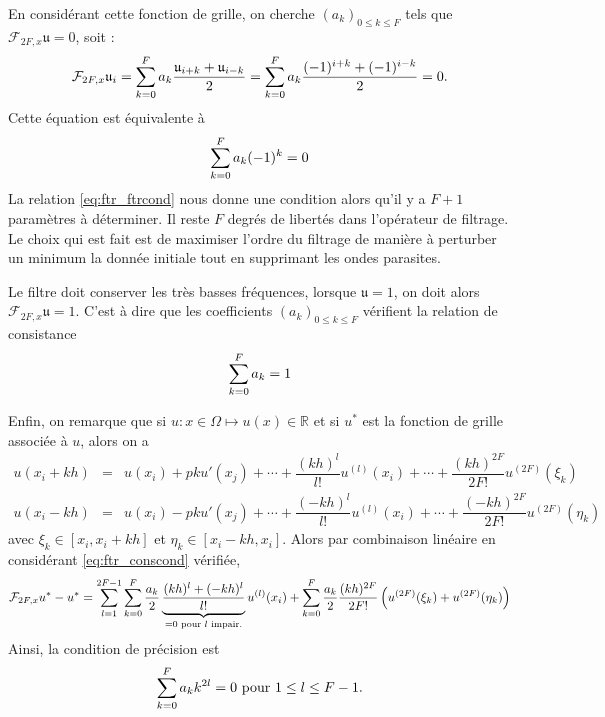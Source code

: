 En considérant cette fonction de grille, on cherche $(a_k)_{0\leq k \leq F}$ tels que $\mathcal{F}_{2F,x} \mathfrak{u} = \mathfrak{0}$, soit :
\begin{equation}
\mathcal{F}_{2F,x}\mathfrak{u}_i = \displaystyle\sum\limits_{k=0}^F a_k \dfrac{\mathfrak{u}_{i+k} + \mathfrak{u}_{i-k}}{2} = \displaystyle\sum\limits_{k=0}^F a_k  \dfrac{(-1)^{i+k} + (-1)^{i-k}}{2} = 0.
\end{equation}
Cette équation est équivalente à 
\begin{equation}
\displaystyle\sum\limits_{k=0}^F a_k (-1)^k = 0
\label{eq:ftr_ftrcond}
\end{equation}
La relation \eqref{eq:ftr_ftrcond} nous donne une condition alors qu'il y a $F+1$ paramètres à déterminer. Il reste $F$ degrés de libertés dans l'opérateur de filtrage. Le choix qui est fait est de maximiser l'ordre du filtrage de manière à perturber un minimum la donnée initiale tout en supprimant les ondes parasites.

Le filtre doit conserver les très basses fréquences, lorsque $\mathfrak{u} = \mathfrak{1}$, on doit alors $\mathcal{F}_{2F,x}\mathfrak{u} = \mathfrak{1}$.
C'est à dire que les coefficients $(a_k)_{0 \leq k \leq F}$ vérifient la relation de consistance
\begin{equation}
\displaystyle\sum\limits_{k=0}^F a_k = 1
\label{eq:ftr_conscond}
\end{equation}

Enfin, on remarque que si $u : x \in \Omega \mapsto u(x) \in \mathbb{R}$ et si $u^*$ est la fonction de grille associée à $u$, alors on a 
\begin{equation}
\begin{array}{rcl}
u(x_i + kh) & = & u(x_i) + p k u'(x_j) + \cdots + \dfrac{(kh)^l}{l!}u^{(l)}(x_i) + \cdots +\dfrac{(kh)^{2F}}{2F!} u^{(2F)}(\xi_k)\\
u(x_i - kh) & = & u(x_i) - p k u'(x_j) + \cdots + \dfrac{(-kh)^l}{l!}u^{(l)}(x_i) + \cdots +\dfrac{(-kh)^{2F}}{2F!} u^{(2F)}(\eta_k)
\end{array}
\end{equation}
avec $\xi_k \in [x_i, x_i+kh]$ et $\eta_k \in [x_i-kh, x_i]$. Alors par combinaison linéaire en considérant \eqref{eq:ftr_conscond} vérifiée, 
\begin{equation}
\mathcal{F}_{2F,x}u^* - u^* = \displaystyle\sum\limits_{l=1}^{2F-1} \displaystyle\sum\limits_{k=0}^F \dfrac{a_k}{2} \underbrace{\dfrac{(kh)^l + (-kh)^l}{l!}}_{=0 \text{ pour } l \text{ impair.}}u^{(l)}(x_i) + \displaystyle\sum\limits_{k=0}^F \dfrac{a_k}{2}\dfrac{(kh)^{2F}}{2F!} \left( u^{(2F)}(\xi_k) + u^{(2F)}(\eta_k) \right)
\end{equation}
Ainsi, la condition de précision est 
\begin{equation}
\displaystyle\sum\limits_{k=0}^F a_k k^{2l} = 0 \text{ pour } 1 \leq l \leq F-1.
\label{eq:ftr_prescond}
\end{equation}

